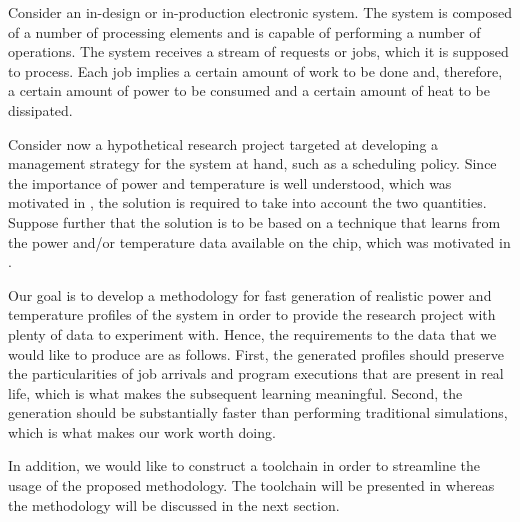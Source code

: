 Consider an in-design or in-production electronic system. The system is composed
of a number of processing elements and is capable of performing a number of
operations. The system receives a stream of requests or jobs, which it is
supposed to process. Each job implies a certain amount of work to be done and,
therefore, a certain amount of power to be consumed and a certain amount of heat
to be dissipated.

Consider now a hypothetical research project targeted at developing a management
strategy for the system at hand, such as a scheduling policy. Since the
importance of power and temperature is well understood, which was motivated in
, the solution is required to take into account the two
quantities. Suppose further that the solution is to be based on a technique that
learns from the power and/or temperature data available on the chip, which was
motivated in .

Our goal is to develop a methodology for fast generation of realistic power and
temperature profiles of the system in order to provide the research project with
plenty of data to experiment with. Hence, the requirements to the data that we
would like to produce are as follows. First, the generated profiles should
preserve the particularities of job arrivals and program executions that are
present in real life, which is what makes the subsequent learning meaningful.
Second, the generation should be substantially faster than performing
traditional simulations, which is what makes our work worth doing.

In addition, we would like to construct a toolchain in order to streamline the
usage of the proposed methodology. The toolchain will be presented in
 whereas the methodology will be discussed in the next section.
